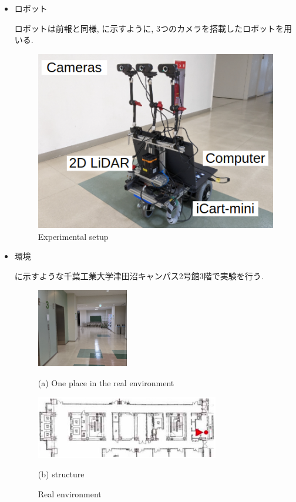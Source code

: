 \begin{itemize}
  \item ロボット
  
  ロボットは前報\cite{okada1}と同様, に示すように, 3つのカメラを搭載したロボットを用いる.

  
  \begin{figure}[hbtp]
    \centering
   \includegraphics[keepaspectratio, scale=0.6]
        {images/gamma3.png}
   \caption{Experimental setup}
   \label{Fig:gamma}
  \end{figure}

  \newpage

  \item 環境

  に示すような千葉工業大学津田沼キャンパス2号館3階で実験を行う.

  \begin{figure}[h]
    \centering
    \begin{minipage}[b]{120mm}
      \centering
      \includegraphics[width=40mm]{images/real.png}
      \caption*{(a) One place in the real environment}
    \end{minipage} 
    \begin{minipage}[b]{120mm}
      \centering
      \includegraphics[width=80mm]{images/tsudanuma_structure.png}
      \caption*{(b) structure}
    \end{minipage}
    \caption{Real environment}
    \label{Fig:real_environment}
  \end{figure}
\end{itemize}

